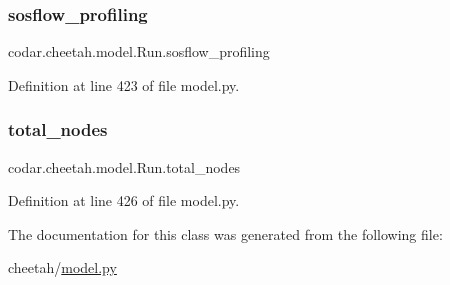 \subsubsection{\texorpdfstring{sosflow\+\_\+profiling}{sosflow\_profiling}}
{\footnotesize\ttfamily codar.\+cheetah.\+model.\+Run.\+sosflow\+\_\+profiling}



Definition at line 423 of file model.\+py.

\mbox{\label{classcodar_1_1cheetah_1_1model_1_1_run_a441a213a4a37f8cde9db77ecb9a72e89}} 
\subsubsection{\texorpdfstring{total\+\_\+nodes}{total\_nodes}}
{\footnotesize\ttfamily codar.\+cheetah.\+model.\+Run.\+total\+\_\+nodes}



Definition at line 426 of file model.\+py.



The documentation for this class was generated from the following file\+:\begin{DoxyCompactItemize}
\item 
cheetah/\hyperlink{cheetah_2model_8py}{model.\+py}\end{DoxyCompactItemize}
